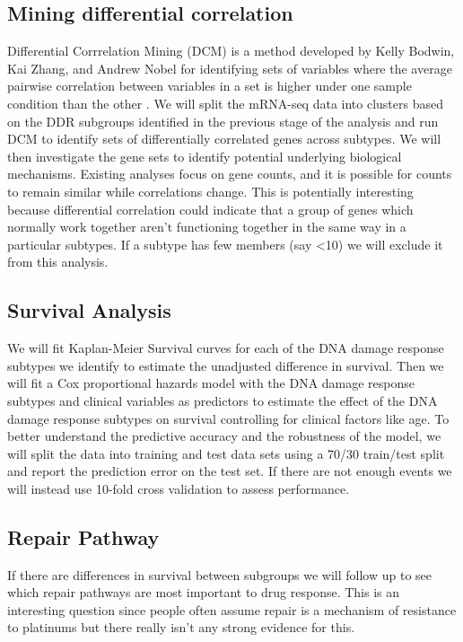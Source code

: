 \documentclass{article}
\begin{document}
\subsection{Mining differential correlation} 
Differential Corrrelation Mining (DCM) is a method developed by Kelly Bodwin, Kai Zhang, and Andrew Nobel for identifying sets of variables where the average pairwise correlation between variables in a set is higher under one sample condition than the other \cite{difcor2016} . We will split the mRNA-seq data into clusters based on the DDR subgroups identified in the previous stage of the analysis and run DCM to identify sets of differentially correlated genes across subtypes. We will then investigate the gene sets to identify potential underlying biological mechanisms. Existing analyses focus on gene counts, and it is possible for counts to remain similar while correlations change. This is potentially interesting because differential correlation could indicate that a group of genes which normally work together aren't functioning together in the same way in a particular subtypes. If a subtype has few members (say <10) we will exclude it from this analysis. 


\subsection{Survival Analysis}
We will fit Kaplan-Meier Survival curves for each of the DNA damage response subtypes we identify to estimate the unadjusted difference in survival. Then we will fit a Cox proportional hazards model with the DNA damage response subtypes and clinical variables as predictors to estimate the effect of the DNA damage response subtypes on survival controlling for clinical factors like age. To better understand the predictive accuracy and the robustness of the model, we will split the data into training and test data sets using a 70/30 train/test split and report the prediction error on the test set. If there are not enough events we will instead use 10-fold cross validation to assess performance. 

\subsection{Repair Pathway}

If there are differences in survival between subgroups we will follow up to see which repair pathways are most important to drug response. This is an interesting question since people often assume repair is a mechanism of resistance to platinums but there really isn't any strong evidence for this.
\end{document}
